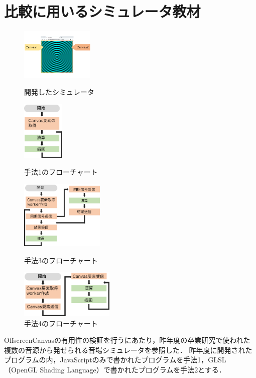 \documentclass[twocolumn,10pt,a4j]{jsarticle}
\begin{document}
\section{比較に用いるシミュレータ教材}
\begin{figure}[b]
\vspace{-6mm}
\begin{minipage}{0.49\hsize}
  \centering
   \includegraphics[width=35mm , angle=-90]{sim.pdf}
   \vspace{-10pt}
  \caption{開発したシミュレータ}
  \label{fig:sim}
 \end{minipage}
 \begin{minipage}{0.49\hsize}
  \centering
   \includegraphics[width=20mm]{cpu_chart.pdf}
   \vspace{10pt}
  \caption{手法1のフローチャート}
  \label{fig:cpu}
 \end{minipage}
 
 \begin{minipage}{0.5\hsize}
 \centering
  \vspace{5pt}	
  \includegraphics[width=40mm]{worker_chart2.pdf}
     \belowcaptionskip=25pt
  \abovecaptionskip=5pt
  \caption{手法3のフローチャート}
  \label{fig:worker}
 \end{minipage}
 \begin{minipage}{0.5\hsize}
 \centering
 \vspace{-30pt}	
  \includegraphics[width=45mm  ]{offsc_chart2.pdf}
  \abovecaptionskip=30pt
  \belowcaptionskip=-10pt
  \caption{手法4のフローチャート}
  \label{fig:offsc}
 \end{minipage}
\end{figure}
OffscreenCanvasの有用性の検証を行うにあたり，昨年度の卒業研究で使われた複数の音源から発せられる音場シミュレータを参照した．
昨年度に開発されたプログラムの内，JavaScriptのみで書かれたプログラムを手法1，GLSL（OpenGL Shading Language）で書かれたプログラムを手法2とする．
\end{document}
